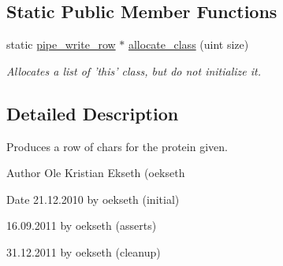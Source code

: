 \subsection*{Static Public Member Functions}
\begin{DoxyCompactItemize}
\item 
\hypertarget{classpipe__write__row_ad164691665e8f304c751f8550adb840f}{
static \hyperlink{classpipe__write__row}{pipe\_\-write\_\-row} $\ast$ \hyperlink{classpipe__write__row_ad164691665e8f304c751f8550adb840f}{allocate\_\-class} (uint size)}
\label{classpipe__write__row_ad164691665e8f304c751f8550adb840f}

\begin{DoxyCompactList}\small\item\em Allocates a list of 'this' class, but do not initialize it. \end{DoxyCompactList}\end{DoxyCompactItemize}


\subsection{Detailed Description}
Produces a row of chars for the protein given. 

\begin{DoxyAuthor}{Author}
Ole Kristian Ekseth (oekseth 
\end{DoxyAuthor}
\begin{DoxyDate}{Date}
21.12.2010 by oekseth (initial) 

16.09.2011 by oekseth (asserts) 

31.12.2011 by oekseth (cleanup) 
\end{DoxyDate}


